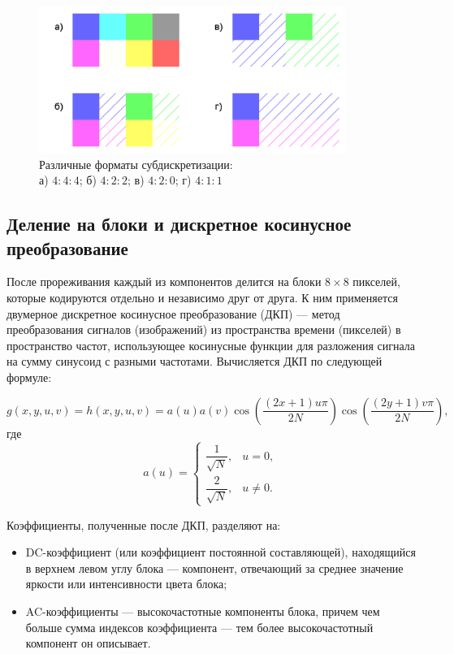 \documentclass[times,specification,annotation]{itmo-student-thesis}
\begin{document}
\begin{figure}[!h]
    \centering
    \includegraphics[width=10cm]{./images/subsampling-examples.png}
    \caption{Различные форматы субдискретизации:\\
        а) $4:4:4$; б) $4:2:2$; в) $4:2:0$; г) $4:1:1$}
    \label{image:subsampling-examples}
\end{figure}

\subsection{Деление на блоки и дискретное косинусное преобразование}\label{subsec:block-partition-and-dct}

После прореживания каждый из компонентов делится на блоки $8\times8$ пикселей, которые кодируются отдельно и независимо друг от друга. К ним применяется двумерное дискретное косинусное преобразование (ДКП) --- метод преобразования сигналов (изображений) из пространства времени (пикселей) в пространство частот, использующее косинусные функции для разложения сигнала на сумму синусоид с разными частотами. Вычисляется ДКП по следующей формуле:

$$g(x, y, u, v) = h(x, y, u, v) = a(u)a(v)\cos\left(\dfrac{(2x + 1)u\pi}{2N}\right)\cos\left(\dfrac{(2y + 1)v\pi}{2N}\right),$$
где
\begin{equation*}
    a(u) = \begin{cases}
        \dfrac{1}{\sqrt{N}}, & u = 0,    \\
        \dfrac{2}{\sqrt{N}}, & u \neq 0.
    \end{cases}
\end{equation*}

Коэффициенты, полученные после ДКП, разделяют на:
\begin{itemize}
    \item DC-коэффициент (или коэффициент постоянной составляющей), находящийся в верхнем левом углу блока --- компонент, отвечающий за среднее значение яркости или интенсивности цвета блока;
    \item AC-коэффициенты --- высокочастотные компоненты блока, причем чем больше сумма индексов коэффициента --- тем более высокочастотный компонент он описывает.
\end{itemize}
\end{document}

